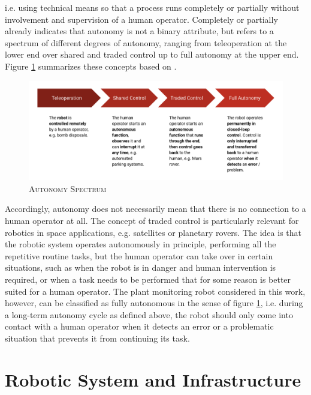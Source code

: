 \documentclass[english, master, utf8]{base/thesis_KBS}
\begin{document}
i.e. using technical means so that a process runs completely or partially without involvement and supervision of a human operator. \cite{Hertzberg:2015}
Completely or partially already indicates that autonomy is not a binary attribute, but refers to a spectrum of different degrees of autonomy,
ranging from teleoperation at the lower end over shared and traded control up to full autonomy at the upper end. \cite{Hertzberg:2015}
Figure \ref{fig:autonomy_spectrum} summarizes these concepts based on \cite{Hertzberg:2015}.
\begin{figure}[H]
    \centering
    \includegraphics[width=\textwidth]{pics/autonomy_spectrum.png}
    \caption{\textsc{Autonomy Spectrum}}
    \label{fig:autonomy_spectrum}
\end{figure}
\noindent
Accordingly, autonomy does not necessarily mean that there is no connection to a human operator at all.
The concept of traded control is particularly relevant for robotics in space applications, e.g. satellites or planetary rovers.
The idea is that the robotic system operates autonomously in principle, performing all the repetitive routine tasks, but the human operator can take over in certain situations,
such as when the robot is in danger and human intervention is required, or when a task needs to be performed that for some reason is better suited for a human operator.
\cite{Kortenkamp:2009}
The plant monitoring robot considered in this work, however, can be classified as fully autonomous in the sense of figure \ref{fig:autonomy_spectrum}, 
i.e. during a long-term autonomy cycle as defined above, the robot should only come into contact with a human operator when it detects an error or a problematic situation
that prevents it from continuing its task.

\section{Robotic System and Infrastructure}
\label{sec:robotic_system}
\end{document}

